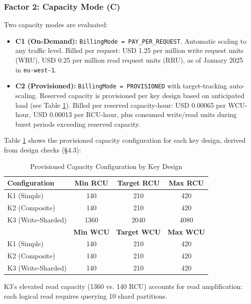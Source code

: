 \subsubsection{Factor 2: Capacity Mode (C)}

Two capacity modes are evaluated:

\begin{itemize}
    \item \textbf{C1 (On-Demand):} \texttt{BillingMode = PAY\_PER\_REQUEST}. Automatic scaling to any traffic level. Billed per request: USD 1.25 per million write request units (WRU), USD 0.25 per million read request units (RRU), as of January 2025 in \texttt{eu-west-1}.
    \item \textbf{C2 (Provisioned):} \texttt{BillingMode = PROVISIONED} with target-tracking auto-scaling. Reserved capacity is provisioned per key design based on anticipated load (see Table \ref{tab:capacity-plan}). Billed per reserved capacity-hour: USD 0.00065 per WCU-hour, USD 0.00013 per RCU-hour, plus consumed write/read units during burst periods exceeding reserved capacity.
\end{itemize}

Table \ref{tab:capacity-plan} shows the provisioned capacity configuration for each key design, derived from design checks (§4.3):

\begin{table}[h]
\centering
\caption{Provisioned Capacity Configuration by Key Design}
\label{tab:capacity-plan}
\begin{tabular}{|l|c|c|c|}
\hline
\textbf{Configuration} & \textbf{Min RCU} & \textbf{Target RCU} & \textbf{Max RCU} \\ \hline
K1 (Simple) & 140 & 210 & 420 \\ \hline
K2 (Composite) & 140 & 210 & 420 \\ \hline
K3 (Write-Sharded) & 1360 & 2040 & 4080 \\ \hline
& \textbf{Min WCU} & \textbf{Target WCU} & \textbf{Max WCU} \\ \hline
K1 (Simple) & 140 & 210 & 420 \\ \hline
K2 (Composite) & 140 & 210 & 420 \\ \hline
K3 (Write-Sharded) & 140 & 210 & 420 \\ \hline
\end{tabular}
\end{table}

K3's elevated read capacity (1360 vs. 140 RCU) accounts for read amplification: each logical read requires querying 10 shard partitions.

